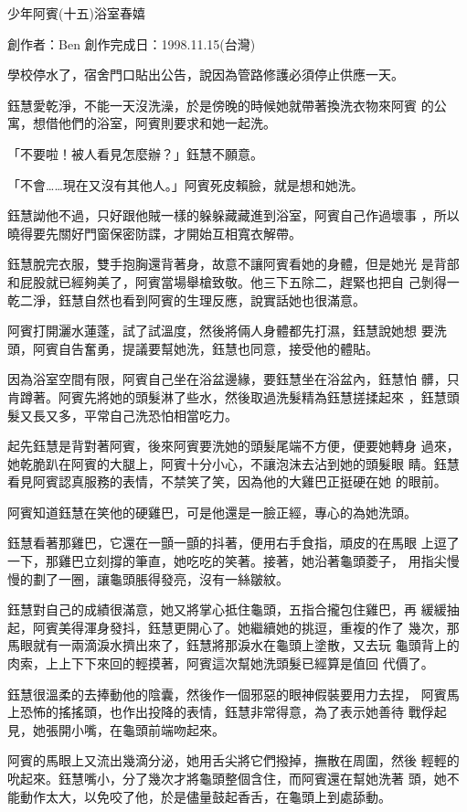 



少年阿賓(十五)浴室春嬉

創作者：Ben
創作完成日：1998.11.15(台灣)


學校停水了，宿舍門口貼出公告，說因為管路修護必須停止供應一天。

鈺慧愛乾淨，不能一天沒洗澡，於是傍晚的時候她就帶著換洗衣物來阿賓
的公寓，想借他們的浴室，阿賓則要求和她一起洗。

「不要啦！被人看見怎麼辦？」鈺慧不願意。

「不會……現在又沒有其他人。」阿賓死皮賴臉，就是想和她洗。

鈺慧詏他不過，只好跟他賊一樣的躲躲藏藏進到浴室，阿賓自己作過壞事
，所以曉得要先關好門窗保密防諜，才開始互相寬衣解帶。

鈺慧脫完衣服，雙手抱胸還背著身，故意不讓阿賓看她的身體，但是她光
是背部和屁股就已經夠美了，阿賓當場舉槍致敬。他三下五除二，趕緊也把自
己剝得一乾二淨，鈺慧自然也看到阿賓的生理反應，說實話她也很滿意。

阿賓打開灑水蓮蓬，試了試溫度，然後將倆人身體都先打濕，鈺慧說她想
要洗頭，阿賓自告奮勇，提議要幫她洗，鈺慧也同意，接受他的體貼。

因為浴室空間有限，阿賓自己坐在浴盆邊緣，要鈺慧坐在浴盆內，鈺慧怕
髒，只肯蹲著。阿賓先將她的頭髮淋了些水，然後取過洗髮精為鈺慧搓揉起來
，鈺慧頭髮又長又多，平常自己洗恐怕相當吃力。

起先鈺慧是背對著阿賓，後來阿賓要洗她的頭髮尾端不方便，便要她轉身
過來，她乾脆趴在阿賓的大腿上，阿賓十分小心，不讓泡沫去沾到她的頭髮眼
睛。鈺慧看見阿賓認真服務的表情，不禁笑了笑，因為他的大雞巴正挺硬在她
的眼前。

阿賓知道鈺慧在笑他的硬雞巴，可是他還是一臉正經，專心的為她洗頭。

鈺慧看著那雞巴，它還在一顫一顫的抖著，便用右手食指，頑皮的在馬眼
上逗了一下，那雞巴立刻撐的筆直，她吃吃的笑著。接著，她沿著龜頭菱子，
用指尖慢慢的劃了一圈，讓龜頭脹得發亮，沒有一絲皺紋。

鈺慧對自己的成績很滿意，她又將掌心抵住龜頭，五指合攏包住雞巴，再
緩緩抽起，阿賓美得渾身發抖，鈺慧更開心了。她繼續她的挑逗，重複的作了
幾次，那馬眼就有一兩滴淚水擠出來了，鈺慧將那淚水在龜頭上塗散，又去玩
龜頭背上的肉索，上上下下來回的輕摸著，阿賓這次幫她洗頭髮已經算是值回
代價了。

鈺慧很溫柔的去捧動他的陰囊，然後作一個邪惡的眼神假裝要用力去捏，
阿賓馬上恐怖的搖搖頭，也作出投降的表情，鈺慧非常得意，為了表示她善待
戰俘起見，她張開小嘴，在龜頭前端吻起來。

阿賓的馬眼上又流出幾滴分泌，她用舌尖將它們撥掉，撫散在周圍，然後
輕輕的吮起來。鈺慧嘴小，分了幾次才將龜頭整個含住，而阿賓還在幫她洗著
頭，她不能動作太大，以免咬了他，於是儘量鼓起香舌，在龜頭上到處舔動。

